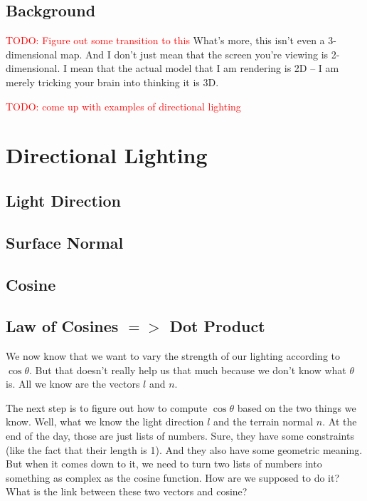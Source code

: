 \documentclass{article}
\newcommand\todo[1]{\textcolor{red}{TODO: #1}}
\begin{document}
\subsection{Background}

\todo{Figure out some transition to this}
What's more, this isn't even a 3-dimensional map.
And I don't just mean that the screen you're viewing is 2-dimensional.
I mean that the actual model that I am rendering is 2D -- I am merely tricking your brain into thinking it is 3D.

\todo{come up with examples of directional lighting}

\section{Directional Lighting}

\subsection{Light Direction}

\subsection{Surface Normal}

\subsection{Cosine}

\subsection{Law of Cosines $=>$ Dot Product}

We now know that we want to vary the strength of our lighting according to $\cos \theta$.
But that doesn't really help us that much because we don't know what $\theta$ is.
All we know are the vectors $l$ and $n$.

The next step is to figure out how to compute $\cos \theta$ based on the two things we know.
Well, what we know the light direction $l$ and the terrain normal $n$.
At the end of the day, those are just lists of numbers.
Sure, they have some constraints (like the fact that their length is 1).
And they also have some geometric meaning.
But when it comes down to it, we need to turn two lists of numbers into something as complex as the cosine function.
How are we supposed to do it?
What is the link between these two vectors and cosine?
\end{document}

